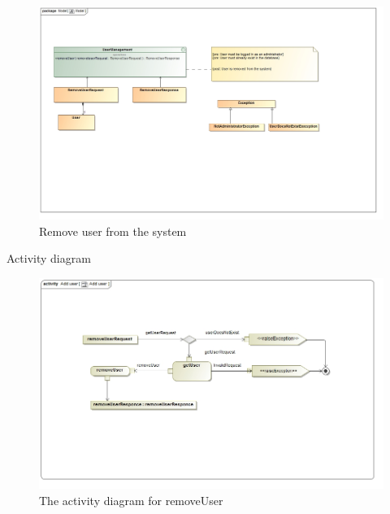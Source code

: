 \documentclass[english]{article}
\begin{document}
\begin{itemize}
			\begin{figure}[H]
				\begin{center}
					\includegraphics[scale=0.25]{removeUserlContract.jpg}
				\end{center}
				\caption{Remove user from the system}
				
			\end{figure}
			
			
			\begin{center}
				Activity diagram
			\end{center}
			
			\begin{figure}[H]
				\begin{center}
					\includegraphics[scale=0.3]{RemoveUser1.jpg}
				\end{center}
				\caption{The activity diagram for removeUser}
				
			\end{figure}
		\end{itemize}		
		
\end{document}
